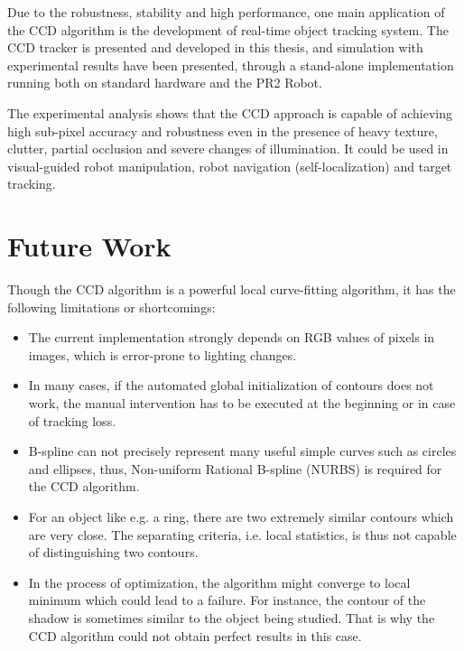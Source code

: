 Due to the robustness, stability and high performance, one main
application of the CCD algorithm is the development of real-time
object tracking system. The CCD tracker is presented and developed in
this thesis, and simulation with experimental results have been presented, through a
stand-alone implementation running both on
standard hardware and the PR2 Robot.


The experimental analysis shows that the CCD approach is capable of
achieving high sub-pixel accuracy and robustness even in the presence
of heavy texture, clutter, partial occlusion and severe changes of
illumination. It could be used in  visual-guided robot
manipulation, robot navigation (self-localization) and target
tracking.

\section{Future Work}
\label{sec:feature}

Though the CCD algorithm is a powerful local curve-fitting algorithm,
it has the following limitations or shortcomings:
\begin{itemize}
\item The current implementation strongly depends on RGB values of pixels in
  images, which is error-prone to lighting changes.%
\item In many cases, if the automated global initialization of contours does
  not work, the manual intervention has to be executed at the beginning or
  in case of tracking loss.
\item B-spline can not precisely represent many useful simple curves
  such as circles and ellipses, thus, Non-uniform Rational B-spline
  (NURBS) is required for the CCD algorithm.
\item For an object like e.g. a ring, there are two extremely similar
  contours which are very close. The separating criteria, i.e. local
  statistics, is thus not capable of distinguishing two contours.
\item In the process of optimization, the algorithm might converge to
  local minimum which could lead to a failure. For instance, the
  contour of the shadow is sometimes similar to the object being
  studied. That is why the CCD algorithm could not obtain perfect results in this case.
\end{itemize}

